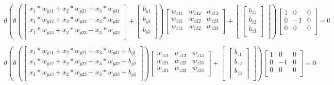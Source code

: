 \documentclass{article}
\begin{document}
\[
\theta(
    \theta(
\begin{bmatrix}   
    x_1*w_{y11} + x_2*w_{y21} + x_3*w_{y31}\\
    x_1*w_{y12} + x_2*w_{y22} + x_3*w_{y32}\\
    x_1*w_{y13} + x_2*w_{y23} + x_3*w_{y33}\\
    \end{bmatrix}
    +
    \begin{bmatrix}
        b_{y1}\\
        b_{y2}\\
        b_{y3}\\
    \end{bmatrix}
    )
\begin{bmatrix}
    w_{z11} & w_{z12} & w_{z13}\\
    w_{z21} & w_{z22} & w_{z23}\\
    w_{z31} & w_{z32} & w_{z33}\\
\end{bmatrix}
    +
\begin{bmatrix}
    \begin{bmatrix}
        b_{z1}\\
        b_{z2}\\
        b_{z3}\\
    \end{bmatrix}
\end{bmatrix}
)
%
\begin{bmatrix}   
    1 & 0 & 0 \\
    0 & -1 & 0 \\
    0 & 0 & 0 \\
    \end{bmatrix} 
%
    = 0
\]

\[
\theta(
    \theta(
\begin{bmatrix}   
    x_1*w_{y11} + x_2*w_{y21} + x_3*w_{y31} + b_{y1}\\
    x_1*w_{y12} + x_2*w_{y22} + x_3*w_{y32} + b_{y2}\\
    x_1*w_{y13} + x_2*w_{y23} + x_3*w_{y33} + b_{y3}\\
    \end{bmatrix}
    )
\begin{bmatrix}
    w_{z11} & w_{z12} & w_{z13}\\
    w_{z21} & w_{z22} & w_{z23}\\
    w_{z31} & w_{z32} & w_{z33}\\
\end{bmatrix}
    +
\begin{bmatrix}
    \begin{bmatrix}
        b_{z1}\\
        b_{z2}\\
        b_{z3}\\
    \end{bmatrix}
\end{bmatrix}
)
%
\begin{bmatrix}   
    1 & 0 & 0 \\
    0 & -1 & 0 \\
    0 & 0 & 0 \\
    \end{bmatrix} 
%
    = 0
\]
\end{document}
